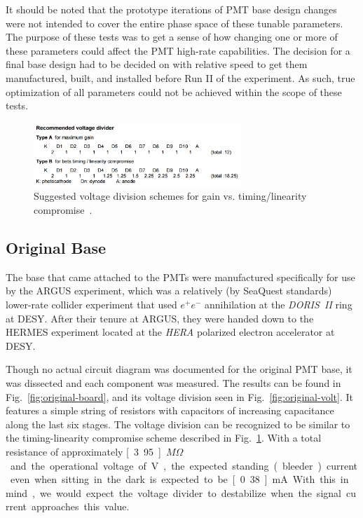 It should be noted that the prototype iterations of PMT base design changes were not intended to cover the entire phase space of these tunable parameters. The purpose of these tests was to get a sense of how changing one or more of these parameters could affect the PMT high-rate capabilities. The decision for a final base design had to be decided on with relative speed to get them manufactured, built, and installed before Run II of the experiment. As such, true optimization of all parameters could not be achieved within the scope of these tests.

\begin{figure}
	\centering
	\includegraphics[width=0.7\textwidth]{figures/pmtupgrade/voltage_divider.png}
	\caption{Suggested voltage division schemes for gain vs. timing/linearity compromise~\cite{tubespecs}.}
	\label{fig:voltage_schemes}
\end{figure}

\subsection{Original Base}

The base that came attached to the PMTs were manufactured specifically for use by the ARGUS experiment, which was a relatively (by SeaQuest standards) lower-rate collider experiment that used $e^+ e^-$ annihilation at the \emph{DORIS\ II} ring at DESY. After their tenure at ARGUS, they were handed down to the HERMES experiment located at the \emph{HERA} polarized electron accelerator at DESY.

Though no actual circuit diagram was documented for the original PMT base, it was dissected and each component was measured. The results can be found in Fig.~\ref{fig:original-board}, and its voltage division seen in Fig.~\ref{fig:original-volt}. It features a simple string of resistors with capacitors of increasing capacitance along the last six stages. The voltage division can be recognized to be similar to the timing-linearity compromise scheme described in Fig.~\ref{fig:voltage_schemes}. With a total resistance of approximately \unit[3.95]{$M\Omega$} and the operational voltage of \unit[-1500]{V}, the expected standing (bleeder) current even when sitting in the dark is expected to be \unit[0.38]{mA}. With this in mind, we would expect the voltage divider to destabilize when the signal current approaches this value.

